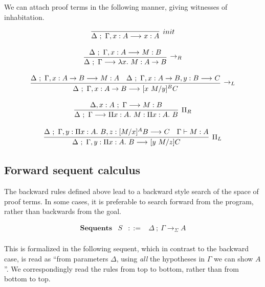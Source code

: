 \documentclass[11pt,twoside]{article}
\begin{document}
  We can attach proof terms in the following manner, giving
witnesses of inhabitation.

$$
\begin{array}{c}
\infer[init]{\Sequent{\Delta}{\Gamma,x:A}{x:A}}{} \\\\
\infer[\LFArr_R]{\Sequent{\Delta}{\Gamma}{\Lam{x}{M} : A\LFArr B}}
                {\Sequent{\Delta}{\Gamma,x:A}{M:B}} \\\\
\infer[\LFArr_L]{\Sequent{\Delta}{\Gamma,x:A\LFArr B}{\HSub{x\ M}{y}{B}{C}}}
                {\Sequent{\Delta}{\Gamma,x:A\LFArr B}{M:A} & 
                 \Sequent{\Delta}{\Gamma,x:A\LFArr B,y:B}{C}}\\\\
\infer[\Pi_R]{\Sequent{\Delta}{\Gamma}{\PiTyp{x}{A}{M}:\PiTyp{x}{A}{B}}}
             {\Sequent{\Delta,x:A}{\Gamma}{M:B}} \\\\
\infer[\Pi_L]{\Sequent{\Delta}{\Gamma,y : \PiTyp{x}{A}{B}}{[y\ M/z] C}}
             {\Sequent{\Delta}{\Gamma,y : \PiTyp{x}{A}{B},z : \HSub{M}{x}{A}{B}}{C} &
              \Gamma \vdash M : A}
\end{array} 
$$

\subsection{Forward sequent calculus}

The backward rules defined above lead to a backward style search
of the space of proof terms.  
 In some cases, it is preferable to
search forward from the program, rather than backwards from the
goal. 

\renewcommand{\Sequent}[4][]{#2\ ;\ #3 \longrightarrow_{#1} #4}

$$
\begin{array}{llll}
\mathbf{Sequents} & S & ::= & \Sequent[\Sigma]{\Delta}{\Gamma}{A} \\
\end{array} 
$$

 This is formalized in the following sequent, which in contrast
to the backward case, is read as ``from parameters $\Delta$,
using \emph{all} the hypotheses in $\Gamma$ we can show $A$''.
We correspondingly read the rules from top to bottom, rather
than from bottom to top.
\end{document}
